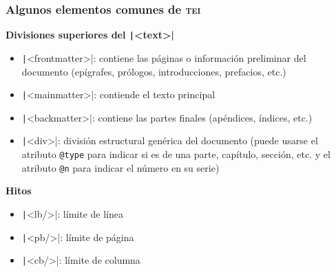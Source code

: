 \documentclass[%
  handout, %
  xcolor=svgnames]{beamer}
\newcommand*{\azul}[1]{\textcolor[HTML]{14145A}{#1}}
\newcommand*{\TEI}{\textsc{tei}}
\begin{document}
\begin{frame}
  \frametitle{Algunos elementos comunes de \TEI}

  \textbf{\azul{Divisiones superiores del \texttt|<text>|}}

  \smallskip

  \begin{itemize}
    \item \texttt|<frontmatter>|: contiene las páginas o información preliminar del documento (epígrafes, prólogos, introducciones, prefacios, etc.) 
    \item \texttt|<mainmatter>|: contiende el texto principal
    \item \texttt|<backmatter>|: contiene las partes finales (apéndices, índices, etc.)
    \item \texttt|<div>|: división estructural genérica del documento (puede usarse el atributo \texttt{@type} para indicar si es de una parte, capítulo, sección, etc. y el atributo \texttt{@n} para indicar el número en su serie)
  \end{itemize}

  \bigskip
  
  \textbf{\azul{Hitos}}

  \smallskip

  \begin{itemize}
    \item \texttt|<lb/>|: límite de línea
    \item \texttt|<pb/>|: límite de página
    \item \texttt|<cb/>|: límite de columna
  \end{itemize}
\end{frame}
\end{document}

